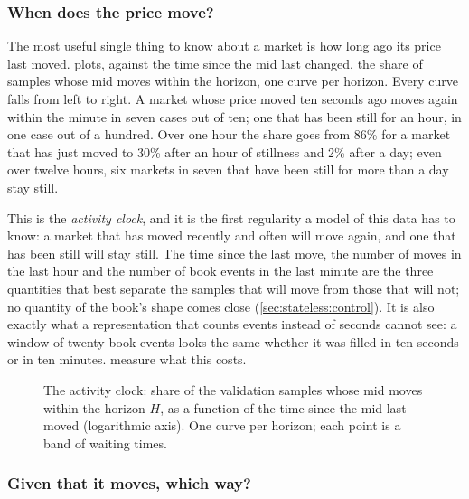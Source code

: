 \subsubsection{When does the price move?}
\label{sec:expl:activity}

The most useful single thing to know about a market is how long ago its price last moved.
 plots, against the time since the mid last changed, the share of
samples whose mid moves within the horizon, one curve per horizon.  Every curve falls from
left to right.  A market whose price moved ten seconds ago moves again within the minute
in seven cases out of ten; one that has been still for an hour, in one case out of a
hundred.  Over one hour the share goes from 86\% for a market that has just moved to 30\%
after an hour of stillness and 2\% after a day; even over twelve hours, six markets in
seven that have been still for more than a day stay still.

This is the \emph{activity clock}, and it is the first regularity a model of this data
has to know: a market that has moved recently and often will move again, and one that has
been still will stay still.  The time since the last move, the number of moves in the last
hour and the number of book events in the last minute are the three quantities that best
separate the samples that will move from those that will not; no quantity of the book's
shape comes close (\cref{sec:stateless:control}).  It is also exactly what a
representation that counts events instead of seconds cannot see: a window of twenty book
events looks the same whether it was filled in ten seconds or in ten minutes.
 measure what this costs.

\begin{figure}[t]
\centering

\caption{The activity clock: share of the validation samples whose mid moves within the
horizon $H$, as a function of the time since the mid last moved (logarithmic axis).  One
curve per horizon; each point is a band of waiting times.}
\label{fig:expl:clock}
\end{figure}

\subsubsection{Given that it moves, which way?}
\label{sec:expl:direction}

